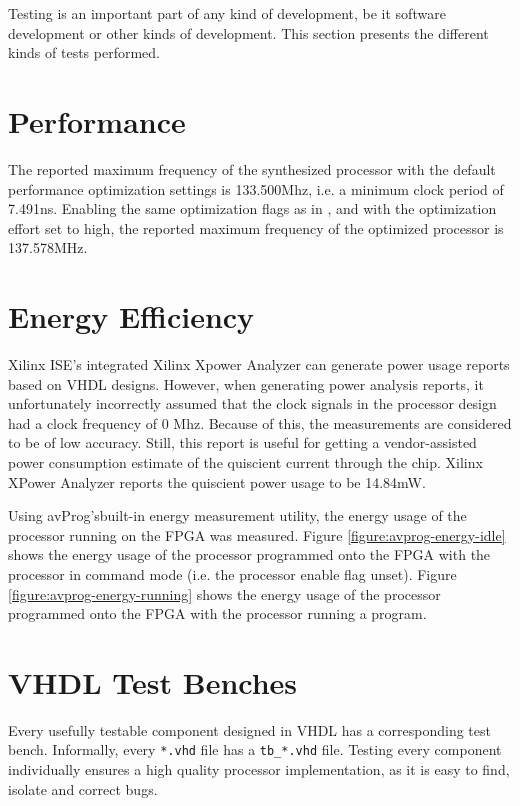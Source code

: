 Testing is an important part of any kind of development, be it software development or other kinds of development.
This section presents the different kinds of tests performed.

\section{Performance}

The reported maximum frequency of the synthesized processor with the default performance optimization settings is 133.500Mhz, i.e. a minimum clock period of 7.491ns.
Enabling the same optimization flags as in \cite{assignment-1}, and with the optimization effort set to high, the reported maximum frequency of the optimized processor is 137.578MHz.

\section{Energy Efficiency}

Xilinx ISE's integrated Xilinx Xpower Analyzer can generate power usage reports based on VHDL designs.
However, when generating power analysis reports, it unfortunately incorrectly assumed that the clock signals in the processor design had a clock frequency of 0 Mhz.
Because of this, the measurements are considered to be of low accuracy.
Still, this report is useful for getting a vendor-assisted power consumption estimate of the quiscient current through the chip.
Xilinx XPower Analyzer reports the quiscient power usage to be 14.84mW.

Using avProg's\cn built-in energy measurement utility, the energy usage of the processor running on the FPGA was measured.
Figure \vref{figure:avprog-energy-idle} shows the energy usage of the processor programmed onto the FPGA with the processor in command mode (i.e. the processor enable flag unset).
Figure \vref{figure:avprog-energy-running} shows the energy usage of the processor programmed onto the FPGA with the processor running a program.

\section{VHDL Test Benches}

Every usefully testable component designed in VHDL has a corresponding test bench.
Informally, every \texttt{*.vhd} file has a \texttt{tb\_*.vhd} file.
Testing every component individually ensures a high quality processor implementation, as it is easy to find, isolate and correct bugs.

